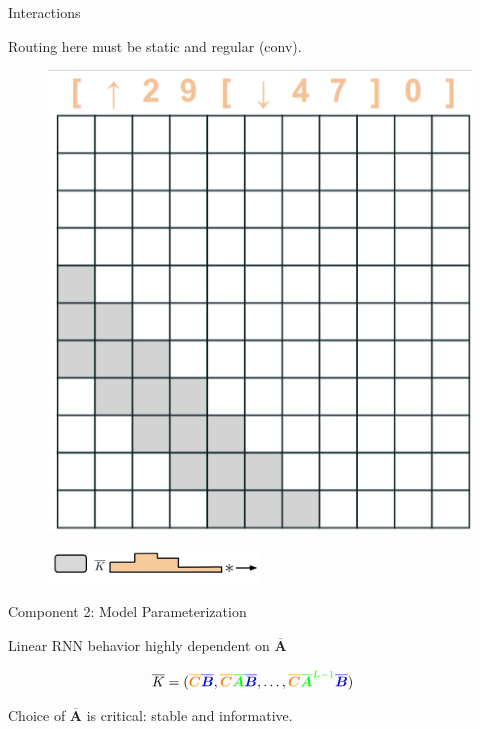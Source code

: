 \begin{frame}{Interactions}
    \begin{center}
        Routing here must be static and regular (conv). 
    \end{center}
    \begin{figure}
        \centering
        \includegraphics[height=0.45\textheight,clip,trim={0.1cm 0.1cm 0.1cm 0.1cm}]{Figs/Allowed.png}
        \vspace{0.5cm}
        
        \includegraphics[width=0.5\textwidth]{Figs/SGParam.pdf}
        \label{fig:my_label}
    \end{figure}
\end{frame}




\begin{frame}{Component 2:  Model Parameterization}

Linear RNN behavior highly dependent on $\boldsymbol{\overline{A}}$

\begin{align*}
\overline{K} &= (\textcolor{orange}{\boldsymbol{\overline{C}}}\textcolor{blue}{\boldsymbol{\overline{B}}}, \textcolor{orange}{\boldsymbol{\overline{C}}}\textcolor{green}{\boldsymbol{\overline{A}}}\textcolor{blue}{\boldsymbol{\overline{B}}}, \dots, \textcolor{orange}{\boldsymbol{\overline{C}}}\textcolor{green}{\boldsymbol{\overline{A}}^{L-1}}\textcolor{blue}{\boldsymbol{\overline{B}}})
\end{align*}
\vspace{0.5cm}

Choice of $\boldsymbol{\overline{A}}$ is critical: stable and informative.
\end{frame}


